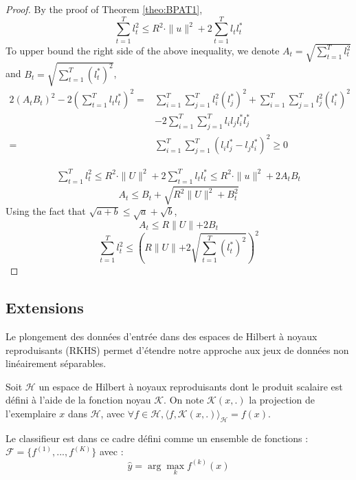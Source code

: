 \documentclass[twocolumn]{article}
\begin{document}
\begin{proof}
	By the proof of Theorem \ref{theo:BPAT1}, 
	\[\sum_{t=1}^{T}l_t^2 \leqslant R^2\cdot \parallel{u}\parallel^2 + 2\sum_{t=1}^{T}l_t l_t^{\ast}\]
	To upper bound the right side of the above inequality, we denote $A_t = \sqrt{\sum_{t=1}^{T}l_t^2}$ and $B_t = \sqrt{\sum_{t=1}^{T}(l_t^{\ast})^2}$, 
	\begin{align}
	2(A_tB_t)^2-2(\sum_{t=1}^{T}l_tl_t^{\ast})^2 =& \sum_{i=1}^{T}\sum_{j=1}^{T}l_i^2(l_j^{\ast})^2+\sum_{i=1}^{T}\sum_{j=1}^{T}l_j^2(l_i^{\ast})^2 \nonumber\\
	&- 2\sum_{i=1}^{T}\sum_{j=1}^{T}l_il_jl_i^{\ast}l_j^{\ast}\nonumber\\
	=& \sum_{i=1}^{T}\sum_{j=1}^{T}(l_il_j^{\ast}-l_jl_i^{\ast})^2 \geqslant 0 \nonumber
	\end{align}
	
	\begin{align}
	\sum_{t=1}^{T}l_t^2 \leqslant R^2 \cdot \parallel{U}\parallel^2+2\sum_{t=1}^{T}l_tl_t^{\ast}\leqslant R^2 \cdot \parallel{u}\parallel^2+2A_tB_t
	\end{align}
	\[A_t \leqslant B_t+\sqrt{R^2\parallel{U}\parallel^2+B_t^2}\]
	Using the fact that $\sqrt{a+b}\leqslant \sqrt{a}+\sqrt{b}$,
	\[A_t \leqslant R\parallel{U}\parallel+2 B_t\]
	\[\sum_{t=1}^{T}l_t^2 \leqslant \left(R\parallel{U}\parallel+2 \sqrt{\sum_{t=1}^{T}(l_t^{\ast})^2}\right)^2 \]
\end{proof}


\subsection{Extensions}
Le plongement des données d'entrée dans des espaces de Hilbert à noyaux reproduisants (RKHS) permet d'étendre notre approche aux jeux de données non linéairement séparables. 

Soit $\mathcal{H}$ un espace de Hilbert à noyaux reproduisants dont le produit scalaire est défini à l'aide de la fonction noyau $\mathcal{K}$. On note $\mathcal{K}(x,.)$ la projection de l'exemplaire $x$ dans $\mathcal{H}$, avec $\forall f \in \mathcal{H}, \langle f,\mathcal{K}(x,.)\rangle_\mathcal{H} = f(x) $.
 

Le classifieur est dans ce cadre défini comme un ensemble de fonctions : $\mathcal{F} = \{f^{(1)}, ..., f^{(K)}\}$ avec :
$$\hat{y} = \arg \max_k f^{(k)}(x)$$
\end{document}
